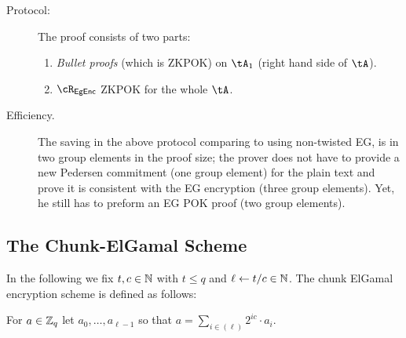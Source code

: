 \begin{description}
\begin{description}
		\item[Protocol:]  The proof consists of two parts:
		\begin{enumerate}
			\item  \textit{Bullet proofs} \cite{SP:BBBPWM18}  (which is  ZKPOK) on $\tA_1$ (\ie right hand side of $\tA$).   
			
			
			
			\item   $\rEgEnc$ ZKPOK  for the whole $\tA$.
			
			
		\end{enumerate}


\item[Efficiency.]
	The saving in the above protocol comparing to using  non-twisted EG, is in  two  group elements in the proof size;  the prover does not have to provide a new Pedersen commitment (one group element)  for the plain text and prove it is consistent with the EG encryption (three group elements). Yet, he still has to preform an EG POK proof (two group elements).
		
	\end{description}

\end{description}





\newcommand{\tsEgKg}{\MathAlgX{TshEgGen}}
	
\newcommand{\tsEgEnc}{\MathAlgX{TshEgEnc}}
\newcommand{\tsEgDec}{\MathAlgX{TshEgDec}}
	
\subsection{The Chunk-ElGamal  Scheme}\label{sec:ChanksEg:EgScheme}
In the following we fix $t,c\in {\mathbb{N}}$ with $t\le q$ and $\ell \leftarrow t/c \in {\mathbb{N}}$. The chunk ElGamal encryption scheme  is defined as follows:



\begin{definition}\label{def:basefactor}
For $a\in {\mathbb Z}_q$ let $a_0,\ldots,a_{\ell-1}$ so that $a =  \sum_{i \in (\ell)}    2^{i c} \cdot a_i$.
\end{definition}


